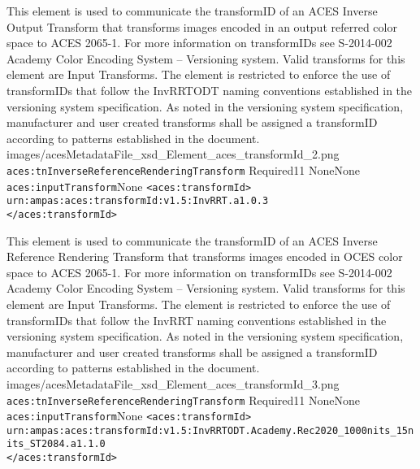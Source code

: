         {This element is used to communicate the transformID of an ACES Inverse Output Transform that transforms images encoded in an output referred color space to ACES 2065-1.  For more information on transformIDs see S-2014-002 Academy Color Encoding System -- Versioning system.  Valid transforms for this element are Input Transforms.  The element is restricted to enforce the use of transformIDs that follow the InvRRTODT naming conventions established in the versioning system specification.  As noted in the versioning system specification, manufacturer and user created transforms shall be assigned a transformID according to patterns established in the document.}
        {images/acesMetadataFile_xsd_Element_aces_transformId_2.png}
        {\texttt{aces:tnInverseReferenceRenderingTransform}}
        {Required}{1}{1}
        {None}{None}
        {\texttt{aces:inputTransform}}{None}
        {\lstinline{<aces:transformId>}\\
        \lstinline{urn:ampas:aces:transformId:v1.5:InvRRT.a1.0.3}\\
        \lstinline{</aces:transformId>}}

        {This element is used to communicate the transformID of an ACES Inverse Reference Rendering Transform that transforms images encoded in OCES color space to ACES 2065-1.  For more information on transformIDs see S-2014-002 Academy Color Encoding System -- Versioning system.  Valid transforms for this element are Input Transforms.  The element is restricted to enforce the use of transformIDs that follow the InvRRT naming conventions established in the versioning system specification.  As noted in the versioning system specification, manufacturer and user created transforms shall be assigned a transformID according to patterns established in the document.}
        {images/acesMetadataFile_xsd_Element_aces_transformId_3.png}
        {\texttt{aces:tnInverseReferenceRenderingTransform}}
        {Required}{1}{1}
        {None}{None}
        {\texttt{aces:inputTransform}}{None}
        {\lstinline{<aces:transformId>} \\
        \lstinline{urn:ampas:aces:transformId:v1.5:InvRRTODT.Academy.Rec2020_1000nits_15nits_ST2084.a1.1.0}\\
        \lstinline{</aces:transformId>}}

